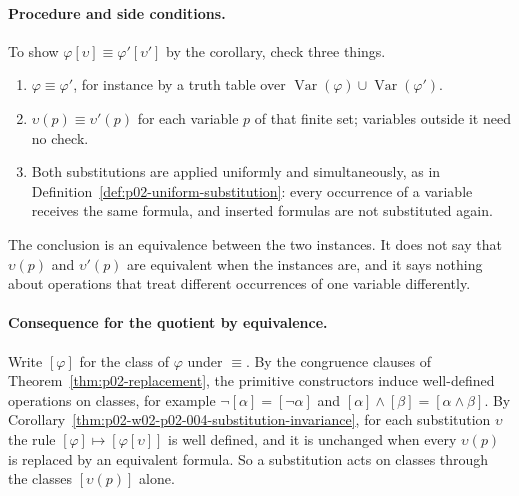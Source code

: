 \paragraph{Procedure and side conditions.}
To show \(\varphi[\upsilon]\equiv\varphi'[\upsilon']\) by the corollary,
check three things.
\begin{enumerate}
  \item \(\varphi\equiv\varphi'\), for instance by a truth table over
        \(\operatorname{Var}(\varphi)\cup\operatorname{Var}(\varphi')\).
  \item \(\upsilon(p)\equiv\upsilon'(p)\) for each variable \(p\) of that
        finite set; variables outside it need no check.
  \item Both substitutions are applied uniformly and simultaneously, as in
        Definition~\ref{def:p02-uniform-substitution}: every occurrence of a
        variable receives the same formula, and inserted formulas are not
        substituted again.
\end{enumerate}
The conclusion is an equivalence between the two instances.  It does not say
that \(\upsilon(p)\) and \(\upsilon'(p)\) are equivalent when the instances
are, and it says nothing about operations that treat different occurrences of
one variable differently.

\paragraph{Consequence for the quotient by equivalence.}
Write \([\varphi]\) for the class of \(\varphi\) under \(\equiv\).  By the
congruence clauses of Theorem~\ref{thm:p02-replacement}, the primitive
constructors induce well-defined operations on classes, for example
\(\neg[\alpha]=[\neg\alpha]\) and
\([\alpha]\land[\beta]=[\alpha\land\beta]\).  By
Corollary~\ref{thm:p02-w02-p02-004-substitution-invariance}, for each
substitution \(\upsilon\) the rule \([\varphi]\mapsto[\varphi[\upsilon]]\)
is well defined, and it is unchanged when every \(\upsilon(p)\) is replaced
by an equivalent formula.  So a substitution acts on classes through the
classes \([\upsilon(p)]\) alone.

